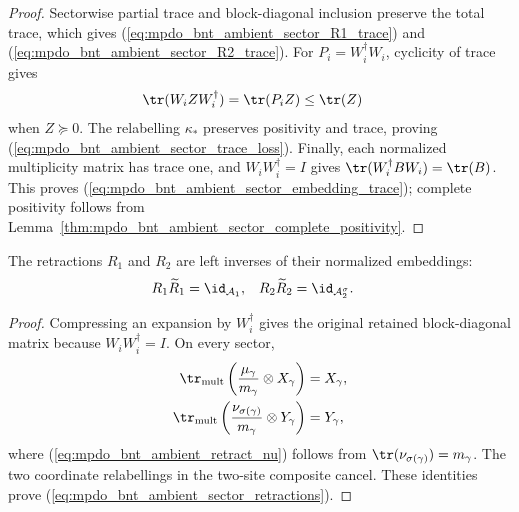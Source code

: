 \begin{proof}\leanok
    Sectorwise partial trace and block-diagonal inclusion preserve the total
    trace, which gives
    (\ref{eq:mpdo_bnt_ambient_sector_R1_trace}) and
    (\ref{eq:mpdo_bnt_ambient_sector_R2_trace}).  For
    $P_i=W_i^\dagger W_i$, cyclicity of trace gives
    \begin{align}
        \tr(W_i ZW_i^\dagger)
         & =\tr(P_i Z)\leq\tr(Z)
        \notag
    \end{align}
    when $Z\succeq0$.  The relabelling $\kappa_\ast$ preserves positivity and
    trace, proving (\ref{eq:mpdo_bnt_ambient_sector_trace_loss}).  Finally, each
    normalized multiplicity matrix has trace one, and
    $W_i W_i^\dagger=I$ gives
    $\tr(W_i^\dagger BW_i)=\tr(B)$.  This proves
    (\ref{eq:mpdo_bnt_ambient_sector_embedding_trace}); complete positivity
    follows from Lemma~\ref{thm:mpdo_bnt_ambient_sector_complete_positivity}.
\end{proof}

\begin{lemma}
    \label{thm:mpdo_bnt_ambient_sector_retractions}
    \leanok
    The retractions $R_1$ and $R_2$ are left inverses of their normalized embeddings:
    \begin{align}
        R_1\widetilde R_1
         & =\id_{\mathcal A_1},
         &
        R_2\widetilde R_2
         & =\id_{\mathcal A_2^\sigma}.
        \label{eq:mpdo_bnt_ambient_sector_retractions}
    \end{align}
\end{lemma}

\begin{proof}\leanok
    Compressing an expansion by $W_i^\dagger$ gives the original retained
    block-diagonal matrix because $W_i W_i^\dagger=I$.  On every sector,
    \begin{align}
        \tr_{\mathrm{mult}}
        \left(\frac{\mu_\gamma}{m_\gamma}\otimes X_\gamma\right)
         & =X_\gamma,
        \notag        \\
        \tr_{\mathrm{mult}}
        \left(\frac{\nu_{\sigma(\gamma)}}{m_\gamma}\otimes Y_\gamma\right)
         & =Y_\gamma,
        \label{eq:mpdo_bnt_ambient_retract_nu}
    \end{align}
    where (\ref{eq:mpdo_bnt_ambient_retract_nu}) follows from
    $\tr(\nu_{\sigma(\gamma)})=m_\gamma$.  The two coordinate relabellings in
    the two-site composite cancel.  These identities prove
    (\ref{eq:mpdo_bnt_ambient_sector_retractions}).
\end{proof}

